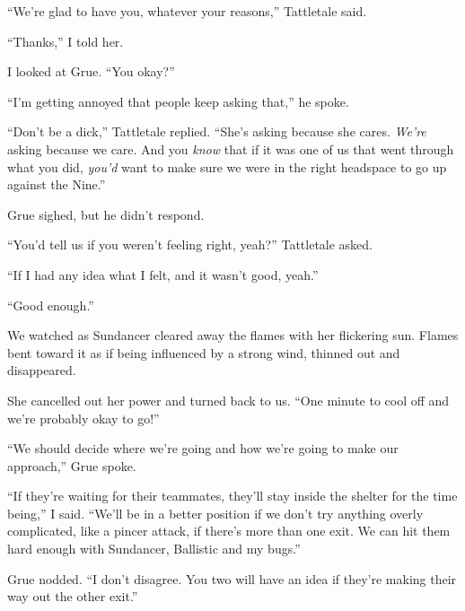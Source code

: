 ``We're glad to have you, whatever your reasons,'' Tattletale said.



``Thanks,'' I told her.



I looked at Grue.  ``You okay?''



``I'm getting annoyed that people keep asking that,'' he spoke.



``Don't be a dick,'' Tattletale replied.  ``She's asking because she cares.  \emph{We're} asking because we care.  And you \emph{know} that if it was one of us that went through what you did, \emph{you'd} want to make sure we were in the right headspace to go up against the Nine.''



Grue sighed, but he didn't respond.



``You'd tell us if you weren't feeling right, yeah?''  Tattletale asked.



``If I had any idea what I felt, and it wasn't good, yeah.''



``Good enough.''



We watched as Sundancer cleared away the flames with her flickering sun.  Flames bent toward it as if being influenced by a strong wind, thinned out and disappeared.



She cancelled out her power and turned back to us.  ``One minute to cool off and we're probably okay to go!''



``We should decide where we're going and how we're going to make our approach,'' Grue spoke.



``If they're waiting for their teammates, they'll stay inside the shelter for the time being,'' I said. ``We'll be in a better position if we don't try anything overly complicated, like a pincer attack, if there's more than one exit.  We can hit them hard enough with Sundancer, Ballistic and my bugs.''



Grue nodded.  ``I don't disagree.  You two will have an idea if they're making their way out the other exit.''



